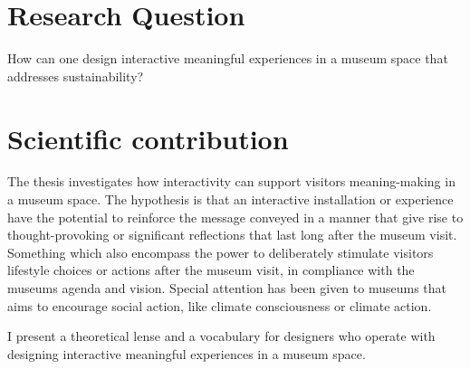 \section{Research Question}
How can one design interactive meaningful experiences in a museum space that addresses sustainability?

\section{Scientific contribution}
The thesis investigates how interactivity can support visitors meaning-making in a museum space. The hypothesis is that an interactive installation or experience have the potential to reinforce the message conveyed in a manner that give rise to thought-provoking or significant reflections that last long after the museum visit. Something which also encompass the power to deliberately stimulate visitors lifestyle choices or actions after the museum visit, in compliance with the museums agenda and vision. Special attention has been given to museums that aims to encourage social action, like climate consciousness or climate action.

I present a theoretical lense and a vocabulary for designers who operate with designing interactive meaningful experiences in a museum space. 